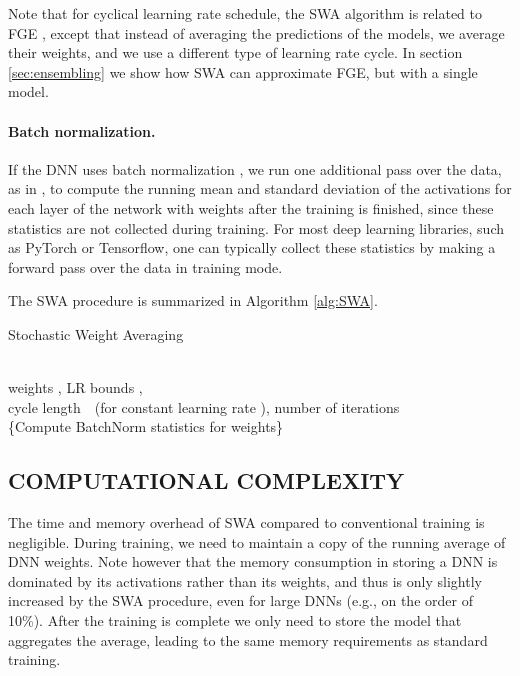 \documentclass[letterpaper]{article}
\begin{document}
Note that for cyclical learning rate schedule, the SWA algorithm is 
related to FGE \citep{garipov2018}, except that instead of
averaging the predictions of the models, we average their weights,
and we use a different type of learning rate cycle.
In section \ref{sec:ensembling} we show how SWA can approximate
FGE, but with a single model.

\paragraph{Batch normalization.} If the DNN uses batch normalization \citep{ioffe2015}, we 
run one additional pass over the data, as in \citet{garipov2018}, to compute the running mean 
and standard deviation of 
the activations for each layer of the network with  weights after the training is 
finished, since these statistics are not collected during training. For most deep learning libraries,
such as PyTorch or Tensorflow, one can typically collect these statistics by making a forward pass 
over the data in training mode.

The SWA procedure is summarized in Algorithm \ref{alg:SWA}.


\begin{algorithm}[!t]
    \caption{Stochastic Weight Averaging}
    \label{alg:SWA}
\begin{algorithmic}
    \REQUIRE ~\\ weights , LR bounds ,\\ 
    cycle length~~(for constant learning rate ), number of iterations 
    \ENSURE  
    \STATE  {}
    \STATE  
    \FOR {}
        \STATE  {}
        \STATE  {}
        \IF{} 
            \STATE {} 
            \STATE {} 
        \ENDIF
    \ENDFOR\\
    \{Compute BatchNorm statistics for  weights\}
\end{algorithmic}
\end{algorithm}



\subsection{COMPUTATIONAL COMPLEXITY}
\label{sec:complexity}

The time and memory overhead of SWA compared to conventional training is negligible.
During training, we need to maintain a copy of the running average of DNN weights.
Note however that the memory consumption in storing a DNN 
is dominated by its activations rather than its weights, and thus is 
only slightly increased by the SWA procedure, even for large DNNs
(e.g., on the order of 10\%).
After the training is complete 
we only need to store the model that aggregates the average,
 leading to the same memory requirements
as standard training.
\end{document}
